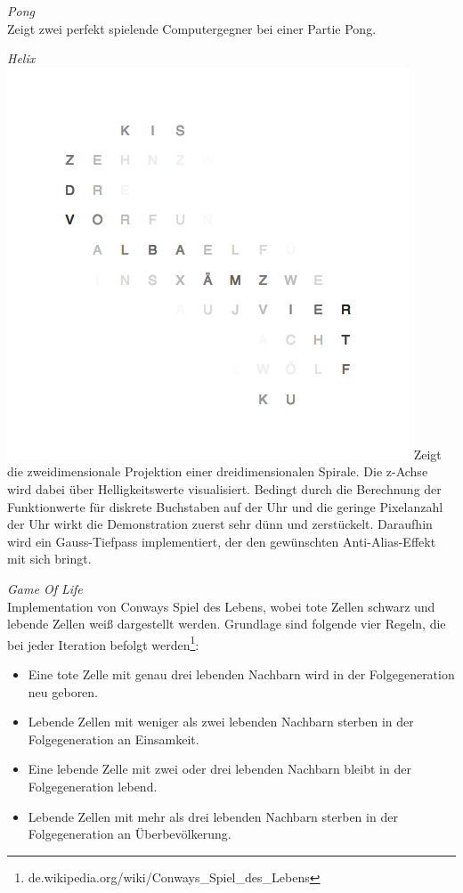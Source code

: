\begin{multicols}{2}
\emph{Pong} \\
Zeigt zwei perfekt spielende Computergegner bei einer Partie Pong.

\emph{Helix} \\
\includegraphics[width=\columnwidth]{Abbildungen/Software/Demo/Helix}
Zeigt die zweidimensionale Projektion einer dreidimensionalen Spirale. Die z-Achse wird dabei über Helligkeitswerte visualisiert.
Bedingt durch die Berechnung der Funktionwerte für diskrete Buchstaben auf der Uhr und die geringe Pixelanzahl der Uhr wirkt die Demonstration zuerst sehr dünn und zerstückelt.
Daraufhin wird ein Gauss-Tiefpass implementiert, der den gewünschten Anti-Alias-Effekt mit sich bringt.

\emph{Game Of Life} \\
Implementation von Conways Spiel des Lebens, wobei tote Zellen schwarz und lebende Zellen weiß dargestellt werden.
Grundlage sind folgende vier Regeln, die bei jeder Iteration befolgt werden\footnote{de.wikipedia.org/wiki/Conways\_Spiel\_des\_Lebens}:
\begin{itemize}
\item Eine tote Zelle mit genau drei lebenden Nachbarn wird in der Folgegeneration neu geboren.
\item Lebende Zellen mit weniger als zwei lebenden Nachbarn sterben in der Folgegeneration an Einsamkeit.
\item Eine lebende Zelle mit zwei oder drei lebenden Nachbarn bleibt in der Folgegeneration lebend.
\item Lebende Zellen mit mehr als drei lebenden Nachbarn sterben in der Folgegeneration an Überbevölkerung.
\end{itemize}


\end{multicols}
